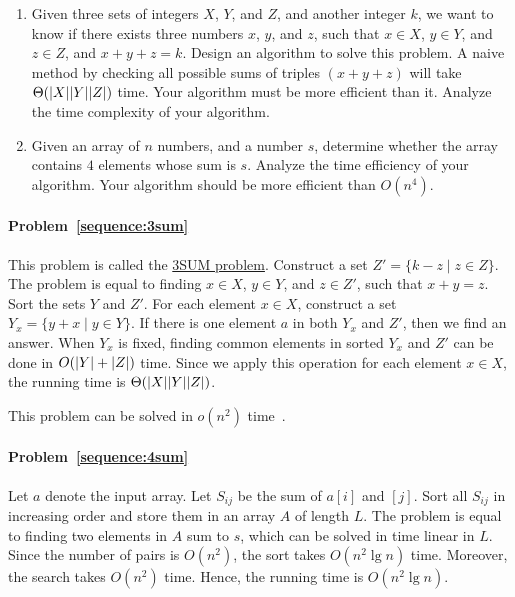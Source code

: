 \begin{Exercise}
\begin{enumerate}
\item Given three sets of integers $X$, $Y$, and $Z$, and another integer $k$, we want to know if there exists three numbers $x$, $y$, and $z$, such that $x \in X$, $y \in Y$, and $z \in Z$, and $x + y + z = k$. Design an algorithm to solve this problem. A naive method by checking all possible sums of triples $(x+y+z)$ will take $\Theta(\lvert X\rvert\lvert Y\rvert\lvert Z\rvert)$ time. Your algorithm must be more efficient than it. Analyze the time complexity of your algorithm. \label{sequence:3sum} 
\item Given an array of $n$ numbers, and a number $s$, determine whether the array contains $4$ elements whose sum is $s$. Analyze the time efficiency of your algorithm. Your algorithm should be more efficient than $O(n^4)$.  \label{sequence:4sum}  
\end{enumerate}
\end{Exercise}
\begin{Answer}
\paragraph{Problem~\ref{sequence:3sum}} 
This problem is called the \href{https://en.wikipedia.org/wiki/3SUM}{3SUM problem}. Construct a set $Z' = \{k - z \mid z \in Z\}$. The problem is equal to finding $x \in X$, $y \in Y$, and $z \in Z'$, such that $x + y = z$. Sort the sets $Y$ and $Z'$. For each element $x \in X$, construct a set $Y_x = \{y + x \mid y \in Y\}$. If there is one element $a$ in both  $Y_x$ and $Z'$, then we find an answer. When $Y_x$ is fixed, finding common elements in sorted $Y_x$ and $Z'$ can be done in $O(\lvert Y\rvert+\lvert Z\rvert)$ time. Since we apply this operation for each element $x \in X$, the running time is $\Theta(\lvert X\rvert\lvert Y\rvert\lvert Z\rvert)$.

\begin{remark}
This problem can be solved in $o(n^2)$ time~\cite{Jorgensen2014}.
\end{remark}

\paragraph{Problem~\ref{sequence:4sum}} Let $a$ denote the input array. Let $S_{ij}$ be the sum of $a[i]$ and $[j]$. Sort all $S_{ij}$ in increasing order and store them in an array $A$ of length $L$. The problem is equal to finding two elements in $A$ sum to $s$, which can be solved in time linear in $L$. Since the number of pairs is $O(n^2)$, the sort takes $O(n^2 \lg n)$ time. Moreover, the search takes $O(n^2)$ time. Hence, the running time is $O(n^2 \lg n)$.
\end{Answer}

